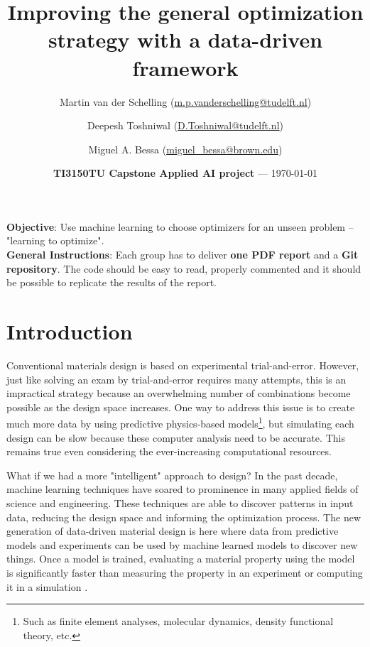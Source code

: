 \documentclass[10pt,a4paper,twoside]{article} %
\title{Improving the general optimization strategy with a data-driven framework} %
\author[1]{Martin van der Schelling (\href{mailto:m.p.vanderschelling@tudelft.nl}{m.p.vanderschelling@tudelft.nl})}
\author[2]{Deepesh Toshniwal (\href{mailto:D.Toshniwal@tudelft.nl}{D.Toshniwal@tudelft.nl})}
\author[3]{Miguel A. Bessa (\href{mailto:miguel\_bessa@brown.edu}{miguel\_bessa@brown.edu})}
\affil[1]{Doctoral Researcher at Delft University of Technology, The Netherlands}
\affil[2]{Assistant Professor at Delft University of Technology, The Netherlands}
\affil[3]{Associate Professor at Brown University, USA}
\date{\textbf{TI3150TU Capstone Applied AI project} --- \today} %
\begin{document}
\maketitle %


\begin{framed}
    \textbf{Objective}: Use machine learning to choose optimizers for an unseen problem -- "learning to optimize".\\
	\textbf{General Instructions}: Each group has to deliver \textbf{one PDF report} and a \textbf{Git repository}. The code should be easy to read, properly commented and it should be possible to replicate the results of the report.
\end{framed}


\section*{Introduction}

Conventional materials design is based on experimental trial-and-error. However, just like solving an exam by trial-and-error requires many attempts, this is an impractical strategy because an overwhelming number of combinations become possible as the design space increases. One way to address this issue is to create much more data by using predictive physics-based models\footnote{Such as finite element analyses, molecular dynamics, density functional theory, etc.}, but simulating each design can be slow because these computer analysis need to be accurate. This remains true even considering the ever-increasing computational resources.

What if we had a more "intelligent" approach to design? In the past decade, machine learning techniques have soared to prominence in many applied fields of science and engineering. These techniques are able to discover patterns in input data, reducing the design space and informing the optimization process. The new generation of data-driven material design is here where data from predictive models and experiments can be used by machine learned models to discover new things. Once a model is trained, evaluating a material property using the model is significantly faster than measuring the property in an experiment or computing it in a simulation \cite{Kadulkar2022, Guo2021}.
\end{document}
